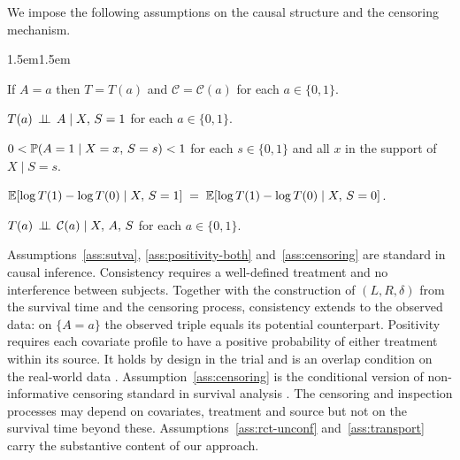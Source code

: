 We impose the following assumptions on the causal structure and the censoring mechanism.
\vspace*{-\parskip}
\begin{adjustwidth}{1.5em}{1.5em}
\setlength{\parskip}{0pt}
\begin{assumption}[Consistency]\label{ass:sutva}
If $A = a$ then $T = T(a)$ and $\mathcal{C} = \mathcal{C}(a)$ for each $a \in \{0, 1\}$.
\end{assumption}

\begin{assumption}\label{ass:rct-unconf}
$T(a) \,\perp\!\!\!\perp\, A \mid X,\, S = 1$ for each $a\in\{0, 1\}$.
\end{assumption}

\begin{assumption}[Positivity]\label{ass:positivity-both}
$0 < \mathbb{P}(A = 1 \mid X = x,\, S = s) < 1$ for each $s \in \{0, 1\}$ and all $x$ in the support of $X \mid S = s$.
\end{assumption}

\begin{assumption}\label{ass:transport}
$\mathbb{E}[\log T(1) - \log T(0) \mid X,\, S = 1] \;=\; \mathbb{E}[\log T(1) - \log T(0) \mid X,\, S = 0]$.
\end{assumption}

\begin{assumption}\label{ass:censoring}
$T(a) \,\perp\!\!\!\perp\, \mathcal{C}(a) \mid X,\, A,\, S$ for each $a\in\{0, 1\}$.
\end{assumption}

\end{adjustwidth}
\setlength{\parskip}{0.8em}
\vspace{0.8em}


Assumptions~\ref{ass:sutva}, \ref{ass:positivity-both} and~\ref{ass:censoring} are standard in causal inference.
Consistency requires a well-defined treatment and no interference between subjects.
Together with the construction of $(L, R, \delta)$ from the survival time and the censoring process, consistency extends to the observed data: on $\{A = a\}$ the observed triple equals its potential counterpart.
Positivity requires each covariate profile to have a positive probability of either treatment within its source.
It holds by design in the trial and is an overlap condition on the real-world data \citep{dahabreh2019generalizing}.
Assumption~\ref{ass:censoring} is the conditional version of non-informative censoring standard in survival analysis \citep{sun2006statistical}.
The censoring and inspection processes may depend on covariates, treatment and source but not on the survival time beyond these.
Assumptions~\ref{ass:rct-unconf} and~\ref{ass:transport} carry the substantive content of our approach.

